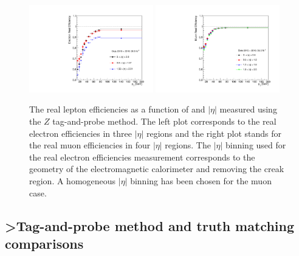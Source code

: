 \begin{figure}[htbp]
\includegraphics[width=0.48\textwidth]{real_electron_efficiency_total_systematics.pdf}
\includegraphics[width=0.48\textwidth]{real_muon_efficiency_total_systematics.pdf}
\caption{The real lepton efficiencies as a function of \pt and $|\eta|$ measured using the $Z$ tag-and-probe method.
The left plot corresponds to the real electron efficiencies in three $|\eta|$ regions and the right plot stands for the real muon efficiencies in four $|\eta|$ regions.
The $|\eta|$ binning used for the real electron efficiencies measurement corresponds to the geometry of the electromagnetic calorimeter and removing the creak region.
A homogeneous $|\eta|$ binning has been chosen for the muon case.}
\label{fig:RLE_real_efficiency_total_systematics}
\end{figure}



\subsection{>Tag-and-probe method and truth matching comparisons}
\label{subsubsec:RLE_truth_matched}

